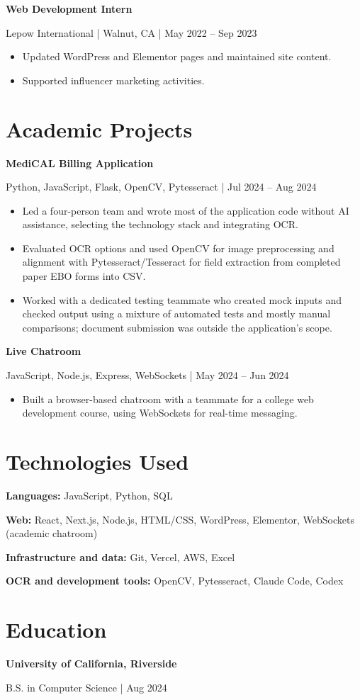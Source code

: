 \documentclass[10pt,letterpaper]{article}
\begin{document}
\textbf{Web Development Intern}\par
Lepow International | Walnut, CA | May 2022 -- Sep 2023
\begin{itemize}
\item Updated WordPress and Elementor pages and maintained site content.
\item Supported influencer marketing activities.
\end{itemize}

\section{Academic Projects}
\textbf{MediCAL Billing Application}\par
Python, JavaScript, Flask, OpenCV, Pytesseract | Jul 2024 -- Aug 2024
\begin{itemize}
\item Led a four-person team and wrote most of the application code without AI assistance, selecting the technology stack and integrating OCR.
\item Evaluated OCR options and used OpenCV for image preprocessing and alignment with Pytesseract/Tesseract for field extraction from completed paper EBO forms into CSV.
\item Worked with a dedicated testing teammate who created mock inputs and checked output using a mixture of automated tests and mostly manual comparisons; document submission was outside the application's scope.
\end{itemize}

\textbf{Live Chatroom}\par
JavaScript, Node.js, Express, WebSockets | May 2024 -- Jun 2024
\begin{itemize}
\item Built a browser-based chatroom with a teammate for a college web development course, using WebSockets for real-time messaging.
\end{itemize}

\section{Technologies Used}
\textbf{Languages:} JavaScript, Python, SQL\par
\textbf{Web:} React, Next.js, Node.js, HTML/CSS, WordPress, Elementor, WebSockets (academic chatroom)\par
\textbf{Infrastructure and data:} Git, Vercel, AWS, Excel\par
\textbf{OCR and development tools:} OpenCV, Pytesseract, Claude Code, Codex

\section{Education}
\textbf{University of California, Riverside}\par
B.S. in Computer Science | Aug 2024
\end{document}
